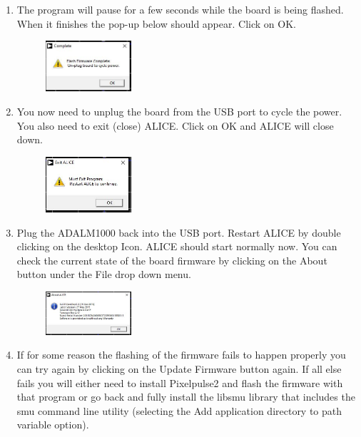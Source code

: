 \documentclass[12pt]{../manual}
\begin{document}
\begin{enumerate}
\begin{figure}[!ht]
\begin{center}
\end{center}
\end{figure}
\newpage
\item The program will pause for a few seconds while the board is being flashed. When it finishes the pop-up below should appear. Click on OK.
\begin{figure}[!ht]
\begin{center}
\includegraphics[width=0.3\textwidth]{figures/Troubleshooting6}
\end{center}
\end{figure}
\item You now need to unplug the board from the USB port to cycle the power. You also need to exit (close) ALICE. Click on OK and ALICE will close down.
\begin{figure}[!ht]
\begin{center}
\includegraphics[width=0.3\textwidth]{figures/Troubleshooting7}
\end{center}
\end{figure}
\item Plug the ADALM1000 back into the USB port. Restart ALICE by double clicking on the desktop Icon. ALICE should start normally now. You can check the current state of the board firmware by clicking on the About button under the File drop down menu.
\begin{figure}[!ht]
\begin{center}
\includegraphics[width=0.3\textwidth]{figures/Troubleshooting8}
\end{center}
\end{figure}
\newpage
\item If for some reason the flashing of the firmware fails to happen properly you can try again by clicking on the Update Firmware button again. If all else fails you will either need to install Pixelpulse2 and flash the firmware with that program or go back and fully install the libsmu library that includes the smu command line utility (selecting the Add application directory to path variable option).

\end{enumerate}
\end{document}
